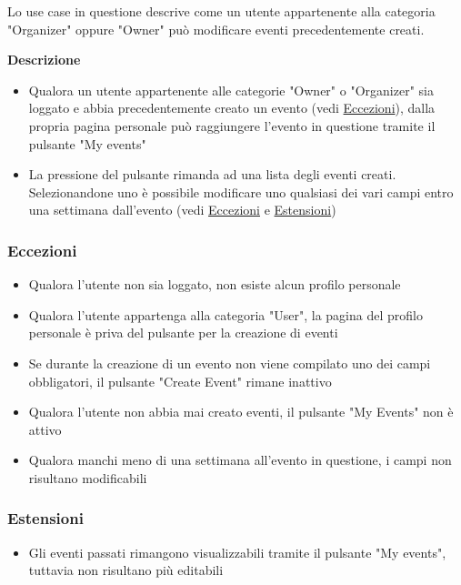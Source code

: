 \documentclass[9pt]{extarticle}
\begin{document}
Lo use case in questione descrive come un utente appartenente alla categoria "Organizer" oppure "Owner" può modificare eventi precedentemente creati.

\textbf{Descrizione}
\begin{itemize}
	\item Qualora un utente appartenente alle categorie "Owner" o "Organizer" sia loggato e abbia precedentemente creato un evento (vedi \hyperref[Eccezioni-FR8-10]{Eccezioni}), dalla propria pagina personale può raggiungere l'evento in questione tramite il pulsante "My events"
	\item La pressione del pulsante rimanda ad una lista degli eventi creati. Selezionandone uno è possibile modificare uno qualsiasi dei vari campi entro una settimana dall'evento (vedi \hyperref[Eccezioni-FR8-10]{Eccezioni} e \hyperref[Estensioni-FR8-10]{Estensioni})
\end{itemize}

\subsubsection*{Eccezioni}\label{Eccezioni-FR8-10}

\begin{itemize}
	\item Qualora l'utente non sia loggato, non esiste alcun profilo personale
	\item Qualora l'utente appartenga alla categoria "User", la pagina del profilo personale è priva del pulsante per la creazione di eventi
	\item Se durante la creazione di un evento non viene compilato uno dei campi obbligatori, il pulsante "Create Event" rimane inattivo
	\item Qualora l'utente non abbia mai creato eventi, il pulsante "My Events" non è attivo
	\item Qualora manchi meno di una settimana all'evento in questione, i campi non risultano modificabili
\end{itemize}

\subsubsection*{Estensioni}\label{Estensioni-FR8-10}

\begin{itemize}
	\item Gli eventi passati rimangono visualizzabili tramite il pulsante "My events", tuttavia non risultano più editabili
\end{itemize}
\end{document}
